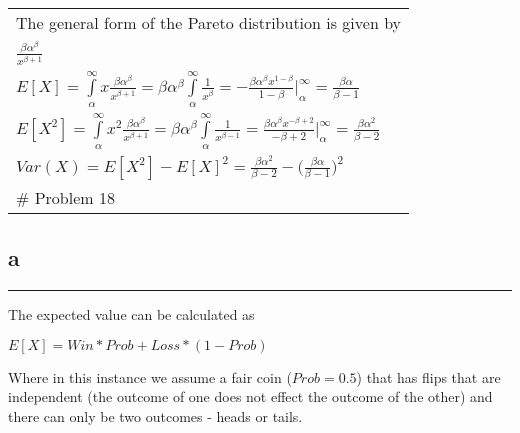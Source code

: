 \documentclass[]{tufte-handout}
\begin{document}
\begin{longtable}[]{@{}l@{}}
\toprule
\endhead
\begin{minipage}[t]{0.48\columnwidth}\raggedright
The general form of the Pareto distribution is given by\strut
\end{minipage}\tabularnewline
\begin{minipage}[t]{0.48\columnwidth}\raggedright
\(\frac{\beta\alpha^\beta}{x^{\beta+1}}\)\strut
\end{minipage}\tabularnewline
\begin{minipage}[t]{0.48\columnwidth}\raggedright
\(E[X] = \int \limits_\alpha^\infty x\frac{\beta\alpha^\beta}{x^{\beta+1}} = \beta\alpha^\beta\int \limits_\alpha^\infty \frac{1}{x^{\beta}} = -\frac{\beta\alpha^\beta x^{1-\beta}}{1-\beta}\Big|^\infty_\alpha = \frac{\beta\alpha}{\beta-1}\)\strut
\end{minipage}\tabularnewline
\begin{minipage}[t]{0.48\columnwidth}\raggedright
\(E[X^2] = \int \limits_\alpha^\infty x^2\frac{\beta\alpha^\beta}{x^{\beta+1}} = \beta\alpha^\beta\int \limits_\alpha^\infty \frac{1}{x^{\beta-1}} = \frac{\beta\alpha^\beta x^{-\beta+2}}{-\beta+2}\Big|^\infty_\alpha = \frac{\beta\alpha^2}{\beta-2}\)\strut
\end{minipage}\tabularnewline
\begin{minipage}[t]{0.48\columnwidth}\raggedright
\(Var(X) = E[X^2] - E[X]^2 = \frac{\beta\alpha^2}{\beta-2} - \Big(\frac{\beta\alpha}{\beta-1}\Big)^2\)\strut
\end{minipage}\tabularnewline
\begin{minipage}[t]{0.48\columnwidth}\raggedright
\# Problem 18\strut
\end{minipage}\tabularnewline
\bottomrule
\end{longtable}

\hypertarget{a-10}{%
\subsection{a}\label{a-10}}

\begin{center}\rule{0.5\linewidth}{0.5pt}\end{center}

The expected value can be calculated as

\(E[X] = Win*Prob + Loss*(1-Prob)\)

Where in this instance we assume a fair coin (\(Prob = 0.5\)) that has
flips that are independent (the outcome of one does not effect the
outcome of the other) and there can only be two outcomes - heads or
tails.
\end{document}
